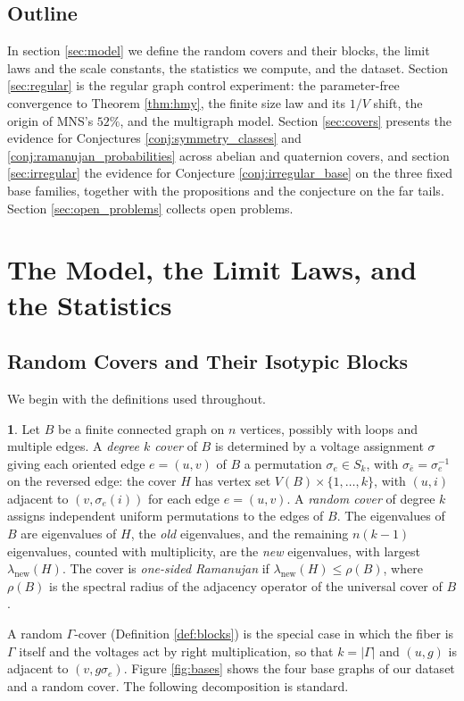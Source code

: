\documentclass[12pt,oneside,english]{amsart}
\numberwithin{equation}{section}
\numberwithin{figure}{section}
\numberwithin{table}{section}
\theoremstyle{plain}
\numberwithin{thm}{section}
\theoremstyle{plain}
\theoremstyle{plain}
\theoremstyle{plain}
\theoremstyle{definition}
\newtheorem{defn}[thm]{\protect\definitionname}
\theoremstyle{definition}
\theoremstyle{definition}
\theoremstyle{remark}
\providecommand{\definitionname}{Definition}
\begin{document}
\subsection{Outline}

In section \ref{sec:model} we define the random covers and their
blocks, the limit laws and the scale constants, the statistics we
compute, and the dataset. Section \ref{sec:regular} is the regular
graph control experiment: the parameter-free convergence to Theorem
\ref{thm:hmy}, the finite size law and its $1/V$ shift, the origin
of MNS's $52\%$, and the multigraph model. Section \ref{sec:covers}
presents the evidence for Conjectures \ref{conj:symmetry_classes}
and \ref{conj:ramanujan_probabilities} across abelian and quaternion
covers, and section \ref{sec:irregular} the evidence for Conjecture
\ref{conj:irregular_base} on the three fixed base families, together
with the propositions and the conjecture on the far tails. Section
\ref{sec:open_problems} collects open problems.

\section{\label{sec:model}The Model, the Limit Laws, and the Statistics}

\subsection{\label{subsec:covers}Random Covers and Their Isotypic Blocks}

We begin with the definitions used throughout.
\begin{defn}
\label{def:covers}Let $B$ be a finite connected graph on $n$ vertices,
possibly with loops and multiple edges. A \emph{degree $k$ cover}
of $B$ is determined by a voltage assignment $\sigma$ giving each
oriented edge $e=(u,v)$ of $B$ a permutation $\sigma_{e}\in S_{k}$,
with $\sigma_{\bar{e}}=\sigma_{e}^{-1}$ on the reversed edge: the
cover $H$ has vertex set $V(B)\times\{1,\dots,k\}$, with $(u,i)$
adjacent to $(v,\sigma_{e}(i))$ for each edge $e=(u,v)$. A \emph{random
cover} of degree $k$ assigns independent uniform permutations to the
edges of $B$. The eigenvalues of $B$ are eigenvalues of $H$, the
\emph{old} eigenvalues, and the remaining $n(k-1)$ eigenvalues, counted
with multiplicity, are the \emph{new} eigenvalues, with largest $\lambda_{\mathrm{new}}(H)$.
The cover is \emph{one-sided Ramanujan} if $\lambda_{\mathrm{new}}(H)\leq\rho(B)$,
where $\rho(B)$ is the spectral radius of the adjacency operator of
the universal cover of $B$.
\end{defn}
A random $\Gamma$-cover (Definition \ref{def:blocks}) is the special
case in which the fiber is $\Gamma$ itself and the voltages act by
right multiplication, so that $k=|\Gamma|$ and $(u,g)$ is adjacent
to $(v,g\sigma_{e})$. Figure \ref{fig:bases} shows the four base graphs
of our dataset and a random cover. The following decomposition is standard.
\end{document}
